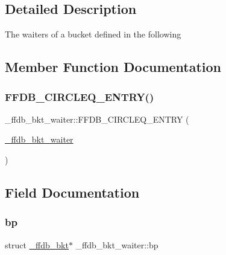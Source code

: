 \subsection{Detailed Description}
The waiters of a bucket defined in the following 

\subsection{Member Function Documentation}
\mbox{\label{struct__ffdb__bkt__waiter_a46ff621e44918a826d983ac183c59c5c}} 
\subsubsection{\texorpdfstring{FFDB\_CIRCLEQ\_ENTRY()}{FFDB\_CIRCLEQ\_ENTRY()}}
{\footnotesize\ttfamily \+\_\+ffdb\+\_\+bkt\+\_\+waiter\+::\+F\+F\+D\+B\+\_\+\+C\+I\+R\+C\+L\+E\+Q\+\_\+\+E\+N\+T\+RY (\begin{DoxyParamCaption}\item[{\mbox{\hyperlink{struct__ffdb__bkt__waiter}{\+\_\+ffdb\+\_\+bkt\+\_\+waiter}}}]{ }\end{DoxyParamCaption})}



\subsection{Field Documentation}
\mbox{\label{struct__ffdb__bkt__waiter_aa1e724eb12131337168b07b4ab071e01}} 
\subsubsection{\texorpdfstring{bp}{bp}}
{\footnotesize\ttfamily struct \mbox{\hyperlink{struct__ffdb__bkt}{\+\_\+ffdb\+\_\+bkt}}$\ast$ \+\_\+ffdb\+\_\+bkt\+\_\+waiter\+::bp}

\mbox{\label{struct__ffdb__bkt__waiter_a508c044094f22ad3c61725a3719147f3}} 
